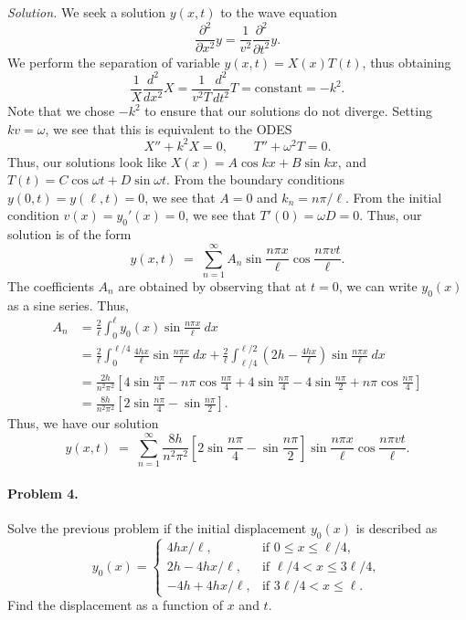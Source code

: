 \documentclass[10pt]{article}
\newcommand\pp[3][]{\frac{\partial^{#1}{#2}}{\partial {#3}^{#1}}}
\newcommand\dd[3][]{\frac{d^{#1}{#2}}{d {#3}^{#1}}}
\begin{document}
        \textit{Solution.} We seek a solution $y(x, t)$ to the wave equation
        \[
                \pp[2]{}{x}y = \frac{1}{v^2}\pp[2]{}{t}y.
        \]
        We perform the separation of variable $y(x, t) = X(x)T(t)$, thus obtaining
        \[
                \frac{1}{X}\dd[2]{}{x}X = \frac{1}{v^2T}\dd[2]{}{t}T = \text{constant} = -k^2.
        \]
        Note that we chose $-k^2$ to ensure that our solutions do not diverge.
        Setting $kv = \omega$, we see that this is equivalent to the ODES
        \[
                X'' + k^2 X = 0, \qquad T'' + \omega^2 T = 0.
        \]
        Thus, our solutions look like $X(x) = A\cos{kx} + B\sin{kx}$, and $T(t) = C\cos{\omega t} + D\sin{\omega t}$.
        From the boundary conditions $y(0, t) = y(\ell, t) = 0$, we see that $A = 0$ and $k_n = n\pi/\ell$.
        From the initial condition $v(x) = y_0'(x) = 0$, we see that $T'(0) = \omega D = 0$. Thus, our solution is of the form
        \[
                y(x, t) \;=\; \sum_{n = 1}^\infty A_n\sin\frac{n\pi x}{\ell} \cos\frac{n\pi vt}{\ell}.
        \]
        The coefficients $A_n$ are obtained by observing that at $t=0$, we can write $y_0(x)$ as a sine series. Thus,
        \begin{align*}
                A_n &= \frac{2}{\ell}\int_0^\ell y_0(x) \sin\frac{n\pi x}{\ell}\: dx \\
                        &= \frac{2}{\ell}\int_0^{\ell/4} \frac{4hx}{\ell}\sin\frac{n\pi x}{\ell}\:dx +
                                \frac{2}{\ell}\int_{\ell/4}^{\ell/2} \left(2h - \frac{4hx}{\ell}\right)\sin\frac{n\pi x}{\ell}\:dx \\
                        &= \frac{2h}{n^2\pi^2}\left[4\sin\frac{n\pi}{4} - n\pi\cos\frac{n\pi}{4}
                                + 4\sin\frac{n\pi}{4} - 4\sin\frac{n\pi}{2} + n\pi\cos\frac{n\pi}{4}\right] \\
                        &= \frac{8h}{n^2\pi^2}\left[2\sin\frac{n\pi}{4} - \sin\frac{n\pi}{2} \right].
        \end{align*}
        Thus, we have our solution
        \[
                y(x, t) \;=\; \sum_{n = 1}^\infty \frac{8h}{n^2\pi^2}\left[2\sin\frac{n\pi}{4} - \sin\frac{n\pi}{2} \right] \sin\frac{n\pi x}{\ell} \cos\frac{n\pi vt}{\ell}.
        \]
        
        \paragraph{Problem 4.} Solve the previous problem if the initial displacement $y_0(x)$ is
        described as
        \[
                y_0(x) = \begin{cases}
                        4hx /\ell, &\text{if } 0 \leq x \leq \ell/4, \\
                        2h - 4hx/\ell, &\text{if } \ell/4 < x \leq 3\ell/4, \\
                        -4h + 4hx/\ell,      &\text{if } 3\ell/4 < x \leq \ell.
                \end{cases}
        \]
        Find the displacement as a function of $x$ and $t$. \\
\end{document}
